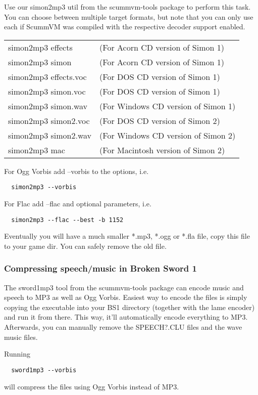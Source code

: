 Use our simon2mp3 util from the scummvm-tools package to perform this task.
You can choose between multiple target formats, but note that you can only use
each if ScummVM was compiled with the respective decoder support enabled.

\begin{tabular}[h]{ll}
  simon2mp3 effects    &(For Acorn CD version of Simon 1)\\
  simon2mp3 simon      &(For Acorn CD version of Simon 1)\\
  simon2mp3 effects.voc&(For DOS CD version of Simon 1)\\
  simon2mp3 simon.voc  &(For DOS CD version of Simon 1)\\
  simon2mp3 simon.wav  &(For Windows CD version of Simon 1)\\
  simon2mp3 simon2.voc &(For DOS CD version of Simon 2)\\
  simon2mp3 simon2.wav &(For Windows CD version of Simon 2)\\
  simon2mp3 mac        &(For Macintosh version of Simon 2)\\
\end{tabular}

For Ogg Vorbis add --vorbis to the options, i.e.
\begin{verbatim}
  simon2mp3 --vorbis
\end{verbatim}
%
For Flac add --flac and optional parameters, i.e.
\begin{verbatim}
  simon2mp3 --flac --best -b 1152 
\end{verbatim}
%
Eventually you will have a much smaller *.mp3, *.ogg or *.fla file, copy this
file to your game dir. You can safely remove the old file.

\subsubsection{Compressing speech/music in Broken Sword 1}

The sword1mp3 tool from the scummvm-tools package can encode music and speech
to MP3 as well as Ogg Vorbis.
Easiest way to encode the files is simply copying the executable into your
BS1 directory (together with the lame encoder) and run it from there.
This way, it'll automatically encode everything to MP3.
Afterwards, you can manually remove the SPEECH?.CLU files and the wave music files.

Running 
\begin{verbatim}
  sword1mp3 --vorbis
\end{verbatim}
%
will compress the files using Ogg Vorbis instead of MP3.

